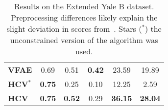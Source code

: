 \begin{table}[ht]
\begin{small}
\begin{tabular}{lccccc}
\textbf{VFAE} & 0.69                                                                                  & 0.51                                                               & \textbf{0.42}                                                           & 23.59                                                             & 19.89                                                        \\
\textbf{HCV}$^*$  & \textbf{0.75}                                                                                  & 0.25                                                               & 0.10                                                           & 12.25                                                             & 2.59 \\
\textbf{HCV}  & \textbf{0.75}                                                                                  & \textbf{0.52}                                                               & 0.29                                                           & \textbf{36.15}                                                             & \textbf{28.04} \\
\bottomrule
\end{tabular}
\end{small}
\caption[Results on the Extended Yale B dataset]{Results on the Extended Yale B dataset. Preprocessing differences likely explain the slight deviation in scores from~\cite{VFAE}. Stars ($^*$) the unconstrained version of the algorithm was used.}
\label{hsicYale}
\end{table}
